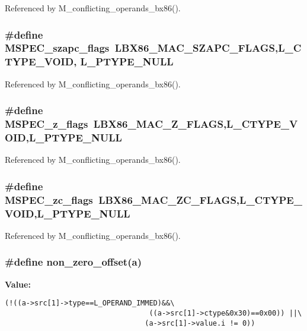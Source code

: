 Referenced by M\_\-conflicting\_\-operands\_\-bx86().
\subsubsection{\setlength{\rightskip}{0pt plus 5cm}\#define MSPEC\_\-szapc\_\-flags~LBX86\_\-MAC\_\-SZAPC\_\-FLAGS,L\_\-CTYPE\_\-VOID, L\_\-PTYPE\_\-NULL}\label{ml__bx86_8c_34d642778c82eee57d7a6ec3b76bb400}




Referenced by M\_\-conflicting\_\-operands\_\-bx86().
\subsubsection{\setlength{\rightskip}{0pt plus 5cm}\#define MSPEC\_\-z\_\-flags~LBX86\_\-MAC\_\-Z\_\-FLAGS,L\_\-CTYPE\_\-VOID,L\_\-PTYPE\_\-NULL}\label{ml__bx86_8c_9658c8ad1a86b49dc25a2bfc2139ec6c}




Referenced by M\_\-conflicting\_\-operands\_\-bx86().
\subsubsection{\setlength{\rightskip}{0pt plus 5cm}\#define MSPEC\_\-zc\_\-flags~LBX86\_\-MAC\_\-ZC\_\-FLAGS,L\_\-CTYPE\_\-VOID,L\_\-PTYPE\_\-NULL}\label{ml__bx86_8c_a1e29100e306c644cab25ccbe75d90a1}




Referenced by M\_\-conflicting\_\-operands\_\-bx86().
\subsubsection{\setlength{\rightskip}{0pt plus 5cm}\#define non\_\-zero\_\-offset(a)}\label{ml__bx86_8c_1a7d03fa0a676d3b09e555d8c8176f1b}


\textbf{Value:}

\begin{Code}\begin{verbatim}(!((a->src[1]->type==L_OPERAND_IMMED)&&\
                                  ((a->src[1]->ctype&0x30)==0x00)) ||\
                                 (a->src[1]->value.i != 0))
\end{verbatim}\end{Code}
